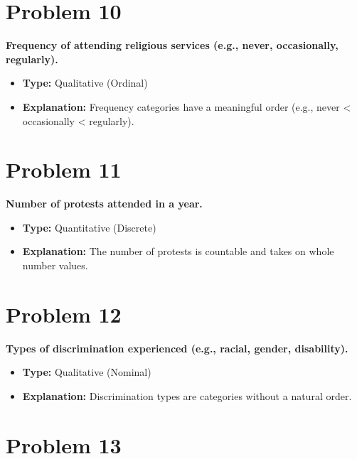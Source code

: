\documentclass[
  letterpaper,
  DIV=11,
  numbers=noendperiod]{scrreprt}
\begin{document}
\section*{Problem 10}\label{problem-10-2}


\textbf{Frequency of attending religious services (e.g., never,
occasionally, regularly).}

\begin{itemize}
\item
  \textbf{Type:} Qualitative (Ordinal)
\item
  \textbf{Explanation:} Frequency categories have a meaningful order
  (e.g., never \textless{} occasionally \textless{} regularly).
\end{itemize}

\section*{Problem 11}\label{problem-11-2}


\textbf{Number of protests attended in a year.}

\begin{itemize}
\item
  \textbf{Type:} Quantitative (Discrete)
\item
  \textbf{Explanation:} The number of protests is countable and takes on
  whole number values.
\end{itemize}

\section*{Problem 12}\label{problem-12-2}


\textbf{Types of discrimination experienced (e.g., racial, gender,
disability).}

\begin{itemize}
\item
  \textbf{Type:} Qualitative (Nominal)
\item
  \textbf{Explanation:} Discrimination types are categories without a
  natural order.
\end{itemize}

\section*{Problem 13}\label{problem-13-2}
\end{document}

